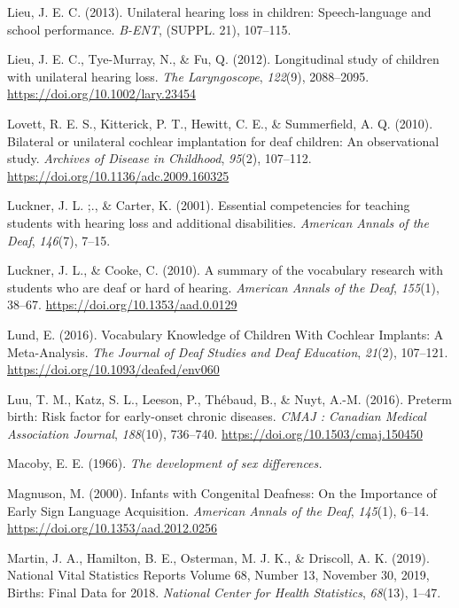 \documentclass[
  english,
  man]{apa6}
\begin{document}
\leavevmode\hypertarget{ref-lieu2013}{}%
Lieu, J. E. C. (2013). Unilateral hearing loss in children: Speech-language and school performance. \emph{B-ENT}, (SUPPL. 21), 107--115.

\leavevmode\hypertarget{ref-lieu2012}{}%
Lieu, J. E. C., Tye-Murray, N., \& Fu, Q. (2012). Longitudinal study of children with unilateral hearing loss. \emph{The Laryngoscope}, \emph{122}(9), 2088--2095. \url{https://doi.org/10.1002/lary.23454}

\leavevmode\hypertarget{ref-lovett2010}{}%
Lovett, R. E. S., Kitterick, P. T., Hewitt, C. E., \& Summerfield, A. Q. (2010). Bilateral or unilateral cochlear implantation for deaf children: An observational study. \emph{Archives of Disease in Childhood}, \emph{95}(2), 107--112. \url{https://doi.org/10.1136/adc.2009.160325}

\leavevmode\hypertarget{ref-luckner2001}{}%
Luckner, J. L. ;., \& Carter, K. (2001). Essential competencies for teaching students with hearing loss and additional disabilities. \emph{American Annals of the Deaf}, \emph{146}(7), 7--15.

\leavevmode\hypertarget{ref-luckner2010}{}%
Luckner, J. L., \& Cooke, C. (2010). A summary of the vocabulary research with students who are deaf or hard of hearing. \emph{American Annals of the Deaf}, \emph{155}(1), 38--67. \url{https://doi.org/10.1353/aad.0.0129}

\leavevmode\hypertarget{ref-lund2016}{}%
Lund, E. (2016). Vocabulary Knowledge of Children With Cochlear Implants: A Meta-Analysis. \emph{The Journal of Deaf Studies and Deaf Education}, \emph{21}(2), 107--121. \url{https://doi.org/10.1093/deafed/env060}

\leavevmode\hypertarget{ref-luu2016}{}%
Luu, T. M., Katz, S. L., Leeson, P., Thébaud, B., \& Nuyt, A.-M. (2016). Preterm birth: Risk factor for early-onset chronic diseases. \emph{CMAJ : Canadian Medical Association Journal}, \emph{188}(10), 736--740. \url{https://doi.org/10.1503/cmaj.150450}

\leavevmode\hypertarget{ref-macoby1966}{}%
Macoby, E. E. (1966). \emph{The development of sex differences.}

\leavevmode\hypertarget{ref-magnuson2000}{}%
Magnuson, M. (2000). Infants with Congenital Deafness: On the Importance of Early Sign Language Acquisition. \emph{American Annals of the Deaf}, \emph{145}(1), 6--14. \url{https://doi.org/10.1353/aad.2012.0256}

\leavevmode\hypertarget{ref-martin2019}{}%
Martin, J. A., Hamilton, B. E., Osterman, M. J. K., \& Driscoll, A. K. (2019). National Vital Statistics Reports Volume 68, Number 13, November 30, 2019, Births: Final Data for 2018. \emph{National Center for Health Statistics}, \emph{68}(13), 1--47.
\end{document}
